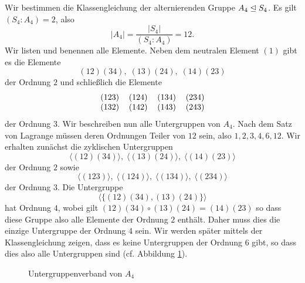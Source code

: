 \documentclass{book}
\begin{document}
\begin{exa}
    \label{exa:a4}
    Wir bestimmen die Klassengleichung der alternierenden Gruppe $A_4 \trianglelefteq S_4$. Es gilt $(S_4:A_4) = 2$, also 
    \[
        |A_4| = \frac{|S_4|}{(S_4:A_4)} = 12.
    \]
    Wir listen und benennen alle Elemente. Neben dem neutralen Element $(1)$ gibt es die Elemente
    \[
        (12)(34),\; (13)(24),\; (14)(23)
    \]
    der Ordnung $2$ und schließlich die Elemente
    \[
        \begin{tabular}{llll}
            (123) & (124) & (134) & (234)\\
            (132) & (142) & (143) & (243)
        \end{tabular}
    \]
    der Ordnung $3$. Wir beschreiben nun alle Untergruppen von $A_4$. Nach dem Satz von Lagrange müssen deren Ordnungen Teiler von $12$ sein, also $1,2,3,4,6,12$. 
    Wir erhalten zunächst die zyklischen Untergruppen 
    \[
        \langle(12)(34)\rangle,\;\langle(13)(24)\rangle,\;\langle(14)(23)\rangle
    \]
    der Ordnung $2$ sowie
    \[
        \langle(123)\rangle,\;\langle(124)\rangle,\;\langle(134)\rangle,\;\langle(234)\rangle
    \]
    der Ordnung $3$. Die Untergruppe 
    \[
        \langle\{(12)(34),(13)(24)\}\rangle
    \]
    hat Ordnung $4$, wobei gilt $(12)(34)\circ(13)(24) = (14)(23)$ so dass
    diese Gruppe also alle Elemente der Ordnung $2$ enthält. Daher muss dies
    die einzige Untergruppe der Ordnung $4$ sein. Wir werden später mittels der
    Klassengleichung zeigen, dass es keine Untergruppen der Ordnung $6$ gibt,
    so dass dies also alle Untergruppen sind (cf. Abbildung \ref{fig:latticea4}).
    \begin{figure}[htpb]
        \centering
        \small
        \caption{Untergruppenverband von $A_4$}%
        \label{fig:latticea4}
    \end{figure}


\end{exa}
\end{document}
